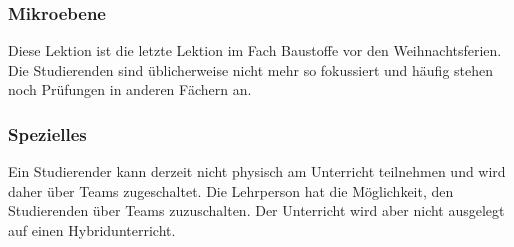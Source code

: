 \documentclass[
11pt,
captions=tableheading,
headsepline,
footsepline, 
captions=tableheading,
parskip=half-,
]{scrartcl}
\begin{document}
\subsubsection{Mikroebene}
Diese Lektion ist die letzte Lektion im Fach Baustoffe vor den Weihnachtsferien. 
Die Studierenden sind üblicherweise nicht mehr so fokussiert und häufig stehen noch Prüfungen in anderen Fächern an. 

\subsubsection{Spezielles}
Ein Studierender kann derzeit nicht physisch am Unterricht teilnehmen und wird daher über Teams zugeschaltet. 
Die Lehrperson hat die Möglichkeit, den Studierenden über Teams zuzuschalten. 
Der Unterricht wird aber nicht ausgelegt auf einen Hybridunterricht.
\end{document}
